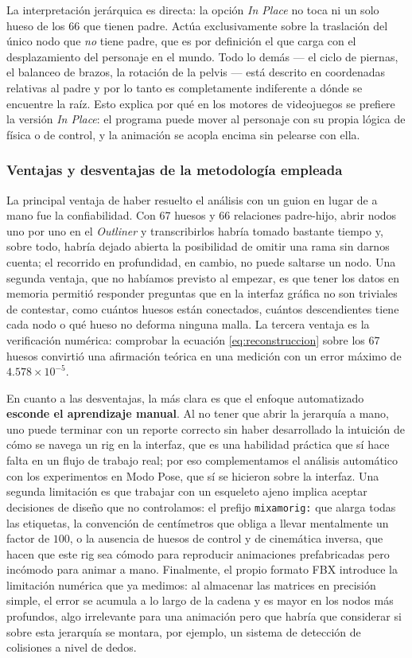 La interpretación jerárquica es directa: la opción \textit{In Place} no toca ni un solo hueso de los 66 que tienen padre. Actúa exclusivamente sobre la traslación del único nodo que \textit{no} tiene padre, que es por definición el que carga con el desplazamiento del personaje en el mundo. Todo lo demás --- el ciclo de piernas, el balanceo de brazos, la rotación de la pelvis --- está descrito en coordenadas relativas al padre y por lo tanto es completamente indiferente a dónde se encuentre la raíz. Esto explica por qué en los motores de videojuegos se prefiere la versión \textit{In Place}: el programa puede mover al personaje con su propia lógica de física o de control, y la animación se acopla encima sin pelearse con ella.

\subsubsection{Ventajas y desventajas de la metodología empleada}
La principal ventaja de haber resuelto el análisis con un guion en lugar de a mano fue la confiabilidad. Con 67 huesos y 66 relaciones padre-hijo, abrir nodos uno por uno en el \textit{Outliner} y transcribirlos habría tomado bastante tiempo y, sobre todo, habría dejado abierta la posibilidad de omitir una rama sin darnos cuenta; el recorrido en profundidad, en cambio, no puede saltarse un nodo. Una segunda ventaja, que no habíamos previsto al empezar, es que tener los datos en memoria permitió responder preguntas que en la interfaz gráfica no son triviales de contestar, como cuántos huesos están conectados, cuántos descendientes tiene cada nodo o qué hueso no deforma ninguna malla. La tercera ventaja es la verificación numérica: comprobar la ecuación \eqref{eq:reconstruccion} sobre los 67 huesos convirtió una afirmación teórica en una medición con un error máximo de $4.578 \times 10^{-5}$.

En cuanto a las desventajas, la más clara es que el enfoque automatizado \textbf{esconde el aprendizaje manual}. Al no tener que abrir la jerarquía a mano, uno puede terminar con un reporte correcto sin haber desarrollado la intuición de cómo se navega un rig en la interfaz, que es una habilidad práctica que sí hace falta en un flujo de trabajo real; por eso complementamos el análisis automático con los experimentos en Modo Pose, que sí se hicieron sobre la interfaz. Una segunda limitación es que trabajar con un esqueleto ajeno implica aceptar decisiones de diseño que no controlamos: el prefijo \texttt{mixamorig:} que alarga todas las etiquetas, la convención de centímetros que obliga a llevar mentalmente un factor de $100$, o la ausencia de huesos de control y de cinemática inversa, que hacen que este rig sea cómodo para reproducir animaciones prefabricadas pero incómodo para animar a mano. Finalmente, el propio formato FBX introduce la limitación numérica que ya medimos: al almacenar las matrices en precisión simple, el error se acumula a lo largo de la cadena y es mayor en los nodos más profundos, algo irrelevante para una animación pero que habría que considerar si sobre esta jerarquía se montara, por ejemplo, un sistema de detección de colisiones a nivel de dedos.

